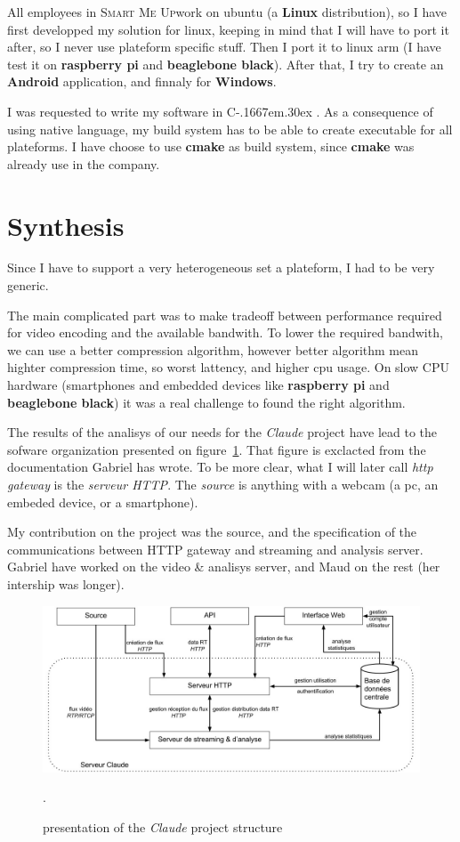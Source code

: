 \documentclass[a4paper,11pt]{custom}
\newcommand{\smu}{\textsc{Smart Me Up}}
\newcommand{\cmake}{\textbf{cmake}}
\newcommand{\rpi}{\textbf{raspberry pi}}
\newcommand{\bbb}{\textbf{beaglebone black}}
\newcommand{\linux}{\textbf{Linux}}
\newcommand{\win}{\textbf{Windows}}
\newcommand{\android}{\textbf{Android}}
\newcommand{\claude}{\textit{Claude}}
\newcommand{\cpp}{%
  C\kern-.1667em\raise.30ex\hbox{\smaller{++}}%
  \spacefactor1000%
}
\begin{document}
All employees in \smu work on ubuntu (a \linux{} distribution), so I have first
developped my solution for linux, keeping in mind that I will have to port it
after, so I never use plateform specific stuff. Then I port it to linux arm (I
have test it on \rpi{} and \bbb). After that, I try to create an \android{}
application, and finnaly for \win.

I was requested to write my software in \cpp. As a consequence of using native
language, my build system has to be able to create executable for all
plateforms. I have choose to use \cmake{} as build system, since \cmake{} was
already use in the company.

\section{Synthesis}

Since I have to support a very heterogeneous set a plateform, I had to be very
generic.

The main complicated part was to make tradeoff between performance required for
video encoding and the available bandwith. To lower the required bandwith, we
can use a better compression algorithm, however better algorithm mean highter
compression time, so worst lattency, and higher cpu usage. On slow CPU hardware
(smartphones and embedded devices like \rpi{} and \bbb{}) it was a real
challenge to found the right algorithm.

The results of the analisys of our needs for the \claude{} project have lead to
the sofware organization presented on figure~\ref{fig:architecture}. That figure
is exclacted from the documentation Gabriel has wrote. To be more clear, what I
will later call \textit{http gateway} is the \textit{serveur HTTP}. The \textit{source} is anything
with a webcam (a pc, an embeded device, or a smartphone).

My contribution on the project was the source, and the specification of the
communications between HTTP gateway and streaming and analysis server. Gabriel
have worked on the video \& analisys server, and Maud on the rest (her intership
was longer).

\begin{figure}
  \centering
  \includegraphics[width=\textwidth]{architecture.jpg}
  \label{fig:architecture}
  \caption{presentation of the \claude{} project structure}.
\end{figure}
\end{document}

